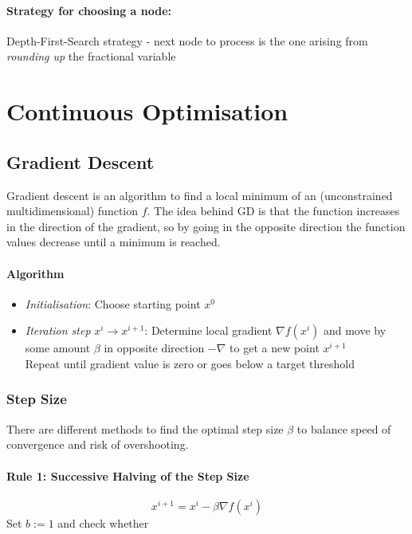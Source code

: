 \documentclass[11pt]{article}
\begin{document}
\paragraph{Strategy for choosing a node:} \textcolor{DodgerBlue1}{Depth-First-Search strategy} - next node to process is the one arising from \emph{rounding up} the fractional variable

\section{Continuous Optimisation}
\subsection{Gradient Descent}
Gradient descent is an algorithm to find a local minimum of an (unconstrained multidimensional) function $f$. The idea behind GD is that the function increases in the direction of the gradient, so by going in the opposite direction the function values decrease until a minimum is reached.

\paragraph{Algorithm}
\begin{itemize}
	\item \emph{Initialisation}: Choose starting point $x^0$
	\item \emph{Iteration step} $x^i \rightarrow x^{i+1}$: Determine local gradient $\nabla f(x^i)$ and move by some amount $\beta$ in opposite direction $-\nabla$ to get a new point $x^{i+1}$\\
	Repeat until gradient value is zero or goes below a target threshold
\end{itemize}

\subsubsection{Step Size}
There are different methods to find the optimal step size $\beta$ to balance speed of convergence and risk of overshooting.

\paragraph{Rule 1: Successive Halving of the Step Size}
\begin{equation*}
	x^{i+1} = x^i - \beta \nabla f(x^i)
\end{equation*}
Set $b := 1$ and check whether
\end{document}
